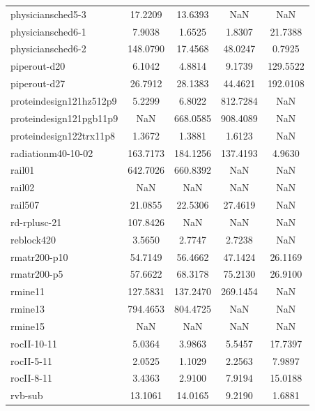 \begin{longtable}{lcccc}
physiciansched5-3           &   17.2209 &  13.6393 &       NaN &       NaN \\
physiciansched6-1           &    7.9038 &   1.6525 &    1.8307 &   21.7388 \\
physiciansched6-2           &  148.0790 &  17.4568 &   48.0247 &    0.7925 \\
piperout-d20                &    6.1042 &   4.8814 &    9.1739 &  129.5522 \\
piperout-d27                &   26.7912 &  28.1383 &   44.4621 &  192.0108 \\
proteindesign121hz512p9     &    5.2299 &   6.8022 &  812.7284 &       NaN \\
proteindesign121pgb11p9     &       NaN & 668.0585 &  908.4089 &       NaN \\
proteindesign122trx11p8     &    1.3672 &   1.3881 &    1.6123 &       NaN \\
radiationm40-10-02          &  163.7173 & 184.1256 &  137.4193 &    4.9630 \\
rail01                      &  642.7026 & 660.8392 &       NaN &       NaN \\
rail02                      &       NaN &      NaN &       NaN &       NaN \\
rail507                     &   21.0855 &  22.5306 &   27.4619 &       NaN \\
rd-rplusc-21                &  107.8426 &      NaN &       NaN &       NaN \\
reblock420                  &    3.5650 &   2.7747 &    2.7238 &       NaN \\
rmatr200-p10                &   54.7149 &  56.4662 &   47.1424 &   26.1169 \\
rmatr200-p5                 &   57.6622 &  68.3178 &   75.2130 &   26.9100 \\
rmine11                     &  127.5831 & 137.2470 &  269.1454 &       NaN \\
rmine13                     &  794.4653 & 804.4725 &       NaN &       NaN \\
rmine15                     &       NaN &      NaN &       NaN &       NaN \\
rocII-10-11                 &    5.0364 &   3.9863 &    5.5457 &   17.7397 \\
rocII-5-11                  &    2.0525 &   1.1029 &    2.2563 &    7.9897 \\
rocII-8-11                  &    3.4363 &   2.9100 &    7.9194 &   15.0188 \\
rvb-sub                     &   13.1061 &  14.0165 &    9.2190 &    1.6881 \\

\end{longtable}
